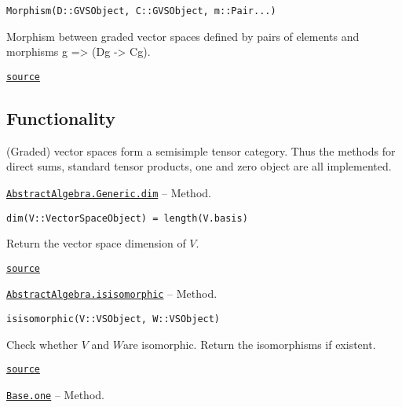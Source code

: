 \documentclass{memoir}
\begin{document}
\begin{adjustwidth}{2em}{0pt}


\begin{verbatim}
Morphism(D::GVSObject, C::GVSObject, m::Pair...)
\end{verbatim}

Morphism between graded vector spaces defined by pairs of elements and morphisms g => (Dg -> Cg).



\href{https://github.com/FabianMaeurer/JuCat.jl/blob/367390e2d003deec2ababa73caeab405e934bb35/src/structures/VectorSpaces/GradedVectorSpaces.jl#L65-L70}{\texttt{source}}


\end{adjustwidth}

\hypertarget{13716495418266911399}{}


\subsection{Functionality}



(Graded) vector spaces form a semisimple tensor category. Thus the methods for direct sums, standard tensor products, one and zero object are all implemented.


\hypertarget{3005374513504276669}{} 
\hyperlink{3005374513504276669}{\texttt{AbstractAlgebra.Generic.dim}}  -- {Method.}

\begin{adjustwidth}{2em}{0pt}


\begin{verbatim}
dim(V::VectorSpaceObject) = length(V.basis)
\end{verbatim}

Return the vector space dimension of \(V\).



\href{https://github.com/FabianMaeurer/JuCat.jl/blob/367390e2d003deec2ababa73caeab405e934bb35/src/structures/VectorSpaces/VectorSpaces.jl#L127-L131}{\texttt{source}}


\end{adjustwidth}
\hypertarget{18052978176005545894}{} 
\hyperlink{18052978176005545894}{\texttt{AbstractAlgebra.isisomorphic}}  -- {Method.}

\begin{adjustwidth}{2em}{0pt}


\begin{verbatim}
isisomorphic(V::VSObject, W::VSObject)
\end{verbatim}

Check whether \(V\) and \(W\)are isomorphic. Return the isomorphisms if existent.



\href{https://github.com/FabianMaeurer/JuCat.jl/blob/367390e2d003deec2ababa73caeab405e934bb35/src/structures/VectorSpaces/VectorSpaces.jl#L162-L166}{\texttt{source}}


\end{adjustwidth}
\hypertarget{15750710740055264726}{} 
\hyperlink{15750710740055264726}{\texttt{Base.one}}  -- {Method.}
\end{document}
